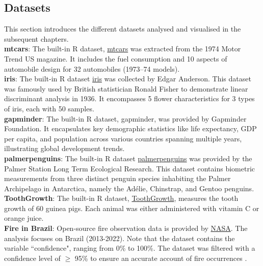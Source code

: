 \documentclass{article}\usepackage[]{graphicx}\usepackage[]{xcolor}
\numberwithin{equation}{section}
\begin{document}
\subsection{Datasets}
\noindent
This section introduces the different datasets analysed and visualised in the subsequent chapters.\\

\noindent \textbf{mtcars}: The built-in R dataset, \href{https://www.rdocumentation.org/packages/datasets/versions/3.6.2/topics/mtcars}{mtcars} was extracted from the 1974 Motor Trend US magazine. It includes the fuel consumption and 10 aspects of automobile design for 32 automobiles (1973–74 models). \\

\noindent
\textbf{iris}: The built-in R dataset \href{https://www.rdocumentation.org/packages/datasets/versions/3.6.2/topics/iris}{iris} was collected by Edgar Anderson. This dataset was famously used by British statistician Ronald Fisher to demonstrate linear discriminant analysis in 1936. It encompasses 5 flower characteristics for 3 types of iris, each with 50 samples. \\

\noindent 
\textbf{gapminder}: The built-in R dataset, gapminder, was provided by Gapminder Foundation. It encapsulates key demographic statistics like life expectancy, GDP per capita, and population across
various countries spanning multiple years, illustrating global development trends.\\

\noindent
\textbf{palmerpenguins}: The built-in R dataset \href{https://www.rdocumentation.org/packages/palmerpenguins/versions/0.1.1}{palmerpenguins} was provided by the Palmer Station Long Term Ecological Research. This dataset contains biometric measurements from three distinct penguin species inhabiting the Palmer Archipelago in Antarctica, namely the Adélie, Chinstrap, and Gentoo penguins.\\

\noindent
\textbf{ToothGrowth}: The built-in R dataset, \href{https://www.rdocumentation.org/packages/datasets/versions/3.6.2/topics/ToothGrowth}{ToothGrowth}, measures the tooth growth of 60 guinea pigs. Each animal was either administered with vitamin C or orange juice.\\

\noindent
\textbf{Fire in Brazil}: Open-source fire observation data is provided by \href{https://firms.modaps.eosdis.nasa.gov/}{NASA}. The analysis focuses on Brazil (2013-2022). Note that the dataset contains the variable ``confidence", ranging from 0\% to 100\%. The dataset was filtered with a confidence level of $\ge$ 95\%  to ensure an accurate account of fire occurrences \cite{nasa_confidence}.\\
\end{document}

